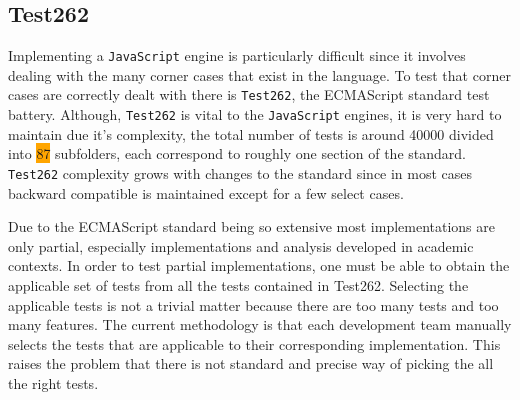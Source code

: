 \documentclass[runningheads]{llncs}
\begin{document}
\subsection{Test262}
\label{subsec:Test262}


Implementing a \texttt{JavaScript} engine is particularly difficult since it involves dealing with the many corner cases that exist in the language. To test that corner cases are correctly dealt with there is \texttt{Test262}\cite{Test262}, the ECMAScript standard test battery. Although, \texttt{Test262} is vital to the \texttt{JavaScript} engines, it is very hard to maintain due it's complexity, the total number of tests is around 40000 divided into \colorbox{orange}{87} subfolders, each correspond to roughly one section of the standard. \texttt{Test262} complexity grows with changes to the standard since in most cases backward compatible is maintained except for a few select cases. 
%



Due to the ECMAScript standard being so extensive most implementations are only partial, especially implementations and analysis developed in academic contexts. In order to test partial implementations, one must be able to obtain the applicable set of tests from all the tests contained in Test262. Selecting the applicable tests is not a trivial matter because there are too many tests and too many features. The current methodology is that each development team manually selects the tests that are applicable to their corresponding implementation. This raises the problem that there is not standard and precise way of picking the all the right tests.
\end{document}
